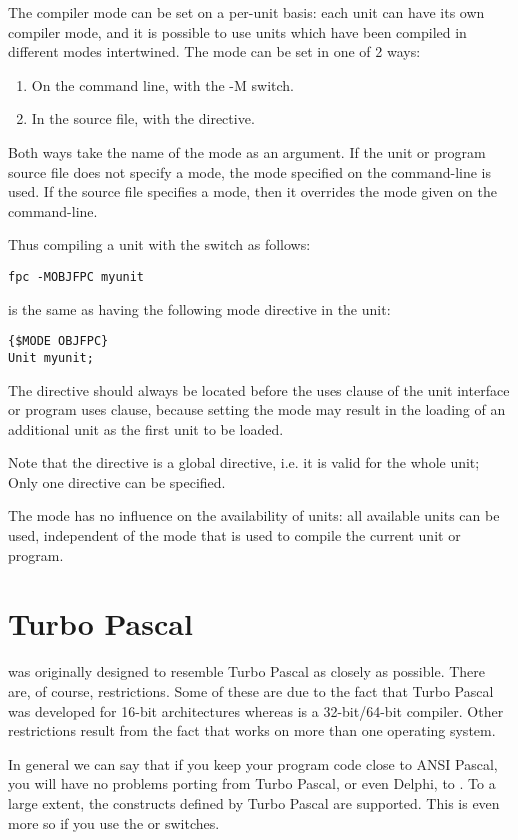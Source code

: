 The compiler mode can be set on a per-unit basis: each unit can have its
own compiler mode, and it is possible to use units which have been compiled
in different modes intertwined. The mode can be set in one of 2 ways:
\begin{enumerate}
\item On the command line, with the -M switch. 
\item In the source file, with the  directive. 
\end{enumerate}
Both ways take the name of the mode as an argument. If the unit or program
source file does not specify a mode, the mode specified on the command-line
is used. If the source file specifies a mode, then it overrides the mode
given on the command-line. 

Thus compiling a unit with the  switch as follows:
\begin{verbatim}
fpc -MOBJFPC myunit
\end{verbatim}
is the same as having the following mode directive in the unit:
\begin{verbatim}
{$MODE OBJFPC}
Unit myunit;
\end{verbatim}
The  directive should always be located before the uses clause of the unit
interface or program uses clause, because setting the mode may result in the
loading of an additional unit as the first unit to be loaded.

Note that the  directive is a global directive, i.e. it is
valid for the whole unit; Only one directive can be specified.

The mode has no influence on the availability of units: all available
units can be used, independent of the mode that is used to compile 
the current unit or program.

\section{Turbo Pascal}
\fpc was originally designed to resemble Turbo Pascal as closely as possible. 
There are, of course, restrictions. Some of these are due to the fact that
Turbo Pascal was developed  for 16-bit architectures whereas  \fpc is
a 32-bit/64-bit compiler. Other restrictions result from the fact that \fpc works
on more than one operating system.

In general we can say that if you keep your program code close to ANSI
Pascal, you will have no problems porting from Turbo Pascal, or even Delphi, to
\fpc. To a large extent, the constructs defined by Turbo Pascal are
supported. This is even more so if you use the  or 
switches.

